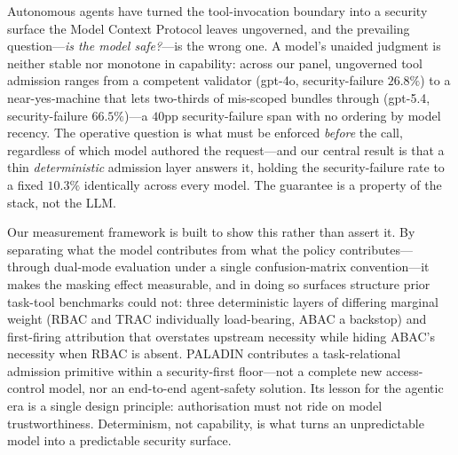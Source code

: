 \documentclass[sigconf,review,anonymous]{acmart}
\begin{document}
Autonomous agents have turned the tool-invocation boundary into a security surface the Model Context Protocol leaves ungoverned, and the prevailing question---\emph{is the model safe?}---is the wrong one. A model's unaided judgment is neither stable nor monotone in capability: across our panel, ungoverned tool admission ranges from a competent validator (gpt-4o, security-failure $26.8\%$) to a near-yes-machine that lets two-thirds of mis-scoped bundles through (gpt-5.4, security-failure $66.5\%$)---a $40$pp security-failure span with no ordering by model recency. The operative question is what must be enforced \emph{before} the call, regardless of which model authored the request---and our central result is that a thin \emph{deterministic} admission layer answers it, holding the security-failure rate to a fixed $10.3\%$ identically across every model. The guarantee is a property of the stack, not the LLM.

Our measurement framework is built to show this rather than assert it. By separating what the model contributes from what the policy contributes---through dual-mode evaluation under a single confusion-matrix convention---it makes the masking effect measurable, and in doing so surfaces structure prior task-tool benchmarks could not: three deterministic layers of differing marginal weight (RBAC and TRAC individually load-bearing, ABAC a backstop) and first-firing attribution that overstates upstream necessity while hiding ABAC's necessity when RBAC is absent. PALADIN contributes a task-relational admission primitive within a security-first floor---not a complete new access-control model, nor an end-to-end agent-safety solution. Its lesson for the agentic era is a single design principle: authorisation must not ride on model trustworthiness. Determinism, not capability, is what turns an unpredictable model into a predictable security surface.



\end{document}
